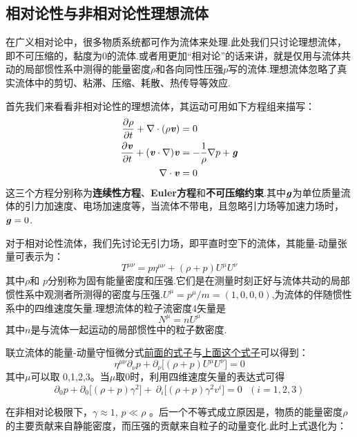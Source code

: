 \documentclass[a4paper]{book}
\newcommand{\xtjc}[1]{\textbf{\textit{#1}}}
\begin{document}
\begin{appendix}
\section{相对论性与非相对论性理想流体}
在广义相对论中，很多物质系统都可作为流体来处理.此处我们只讨论理想流体，即不可压缩的，黏度为0的流体.或者用更加“相对论”的话来讲，就是仅用与流体共动的局部惯性系中测得的能量密度$\rho$和各向同性压强$p$写的流体.理想流体忽略了真实流体中的剪切、粘滞、压缩、耗散、热传导等效应.\par 
首先我们来看看非相对论性的理想流体，其运动可用如下方程组来描写：
\begin{align}
\frac{\partial\rho}{\partial t}+\nabla \cdot(\rho \xtjc{v})&=0 \\
\frac{\partial\xtjc{v}}{\partial t}+(\xtjc{v}\cdot \nabla)\xtjc{v}&=-\frac{1}{\rho}\nabla p+\xtjc{g}\\
\nabla \cdot \xtjc{v}&=0
\end{align}
这三个方程分别称为\textbf{连续性方程}、\textbf{Euler方程}和\textbf{不可压缩约束}.其中$\xtjc{g}$为单位质量流体的引力加速度、电场加速度等，当流体不带电，且忽略引力场等加速力场时，$\xtjc{g}=0$.\par 
对于相对论性流体，我们先讨论无引力场，即平直时空下的流体，其能量-动量张量可表示为：
\begin{equation}\label{A.26}
	T^{\mu \nu }=p\eta^{\mu \nu }+(\rho +p)U^{\mu }U^{\nu}
\end{equation}
其中$\rho$和 $p$分别称为固有能量密度和压强.它们是在测量时刻正好与流体共动的局部惯性系中观测者所测得的密度与压强.$U^\mu=p^\mu/m=(1,0,0,0)$,为流体的伴随惯性系中的四维速度矢量.理想流体的粒子流密度4矢量是
\begin{equation}
	N^{\mu}=nU^{\mu}
\end{equation}
其中$ n $是与流体一起运动的局部惯性中的粒子数密度.\par 
联立流体的能量-动量守恒微分式\hyperref[A.17]{前面的式子}与\hyperref[A.26]{上面这个式子}可以得到：
\begin{equation}
	\eta^{\mu\nu}\partial_{\nu}p+\partial_{\nu}\Big[(\rho+p)U^{\mu}U^{\nu}\Big]=0 
\end{equation}
其中$\mu$可以取 0,1,2,3。当$\mu$取0时，利用四维速度矢量的表达式可得
\begin{equation}
\partial_{0}p+\partial_{0}\Big[(\rho+p)\gamma^{2}\Big]+\ \partial_{i}\Big[(\rho+p)\gamma^{2}v^{i}\Big]=0~~~(i=1,2,3)
\end{equation}\par 
在非相对论极限下，$\gamma\approx1$, $p\ll \rho$ 。后一个不等式成立原因是，物质的能量密度$\rho$的主要贡献来自静能密度，而压强的贡献来自粒子的动量变化.此时上式退化为：

\end{appendix}
\end{document}
